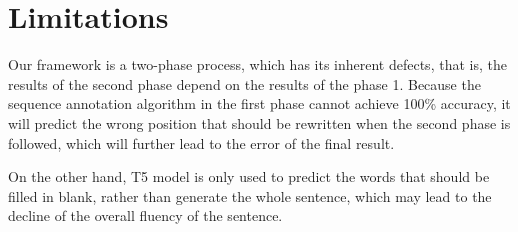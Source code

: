 \section{Limitations}

Our framework is a two-phase process, which has its inherent defects, that is, the results of the second phase depend on the results of the phase 1. Because the sequence annotation algorithm in the first phase cannot achieve 100\% accuracy, it will predict the wrong position that should be rewritten when the second phase is followed, which will further lead to the error of the final result.

On the other hand, T5 model is only used to predict the words that should be filled in blank, rather than generate the whole sentence, which may lead to the decline of the overall fluency of the sentence.
